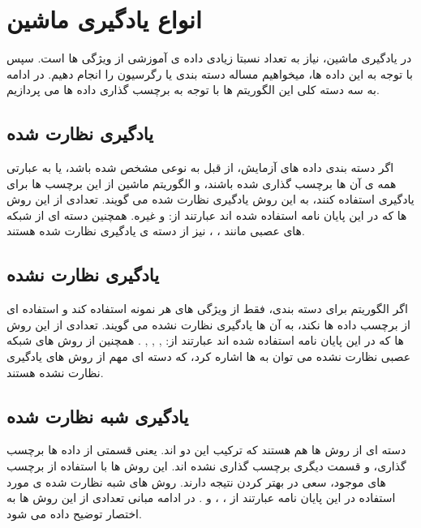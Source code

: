 \section{انواع یادگیری ماشین}

در یادگیری ماشین، نیاز به تعداد نسبتا زیادی داده ی آموزشی از ویژگی ها است. سپس با توجه به این داده ها، میخواهیم مساله دسته بندی یا رگرسیون را انجام دهیم. در ادامه به سه دسته کلی این الگوریتم ها با توجه به برچسب گذاری داده ها می پردازیم.

\subsection{یادگیری نظارت شده}
اگر دسته بندی داده های آزمایش، از قبل به نوعی مشخص شده باشد، یا به عبارتی همه ی آن ها برچسب گذاری شده باشند، و الگوریتم ماشین از این برچسب ها برای یادگیری استفاده کنند، به این روش یادگیری نظارت شده می گویند. تعدادی از این روش ها که در این پایان نامه استفاده شده اند عبارتند از:
و غیره. همچنین دسته ای از شبکه های عصبی مانند
،
،
نیز از دسته ی یادگیری نظارت شده هستند.

\subsection{یادگیری نظارت نشده}
اگر الگوریتم برای دسته بندی، فقط از ویژگی های هر نمونه استفاده کند و استفاده ای از برچسب داده ها نکند، به آن ها یادگیری نظارت نشده می گویند. تعدادی از این روش ها که در این پایان نامه استفاده شده اند عبارتند از:
,
,
,
.
همچنین از روش های شبکه عصبی نظارت نشده می توان به
ها اشاره کرد، که دسته ای مهم از روش های یادگیری نظارت نشده هستند.

\subsection{یادگیری شبه نظارت شده}
دسته ای از روش ها هم هستند که ترکیب این دو اند. یعنی قسمتی از داده ها برچسب گذاری، ‌و قسمت دیگری برچسب گذاری نشده اند.
این روش ها با استفاده از برچسب های موجود، سعی در بهتر کردن نتیجه دارند. روش های شبه نظارت شده ی مورد استفاده در این پایان نامه عبارتند از
،
،
و
.
در ادامه مبانی تعدادی از این روش ها به اختصار توضیح داده می شود.
